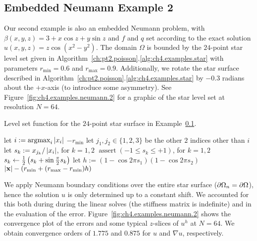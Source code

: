 \subsection{Embedded Neumann Example 2} \label{subsec:ch4.examples.neumann.2}

Our second example is also an embedded Neumann problem, with $\beta(x,y,z) = 3 + x \cos z + y \sin z$ and $f$ and $q$ set according to the exact solution $u(x,y,z) = z \cos \left( x^2 - y^2 \right)$. The domain $\Omega$ is bounded by the $24$-point star level set given in Algorithm~\ref{ch:pt2.poisson}.\ref{alg:ch4.examples.star} with parameters $r_{\text{min}} = 0.6$ and $r_{\text{max}} = 0.9$. Additionally, we rotate the star surface described in Algorithm~\ref{ch:pt2.poisson}.\ref{alg:ch4.examples.star} by $-0.3$ radians about the $+x$-axis (to introduce some asymmetry). See Figure~\ref{fig:ch4.examples.neumann.2} for a graphic of the star level set at resolution $N = 64$.

\begin{algorithm}[htbp]
\caption{Level set function for the $24$-point star surface in Example~\ref{subsec:ch4.examples.neumann.2}.}
\label{alg:ch4.examples.star}
\begin{algorithmic}[1]
\STATE {}
\STATE {}
\STATE let $i := \operatorname{argmax}_i \left\lvert x_i \right\rvert$
    \RETURN $-r_{\text{min}}$
\ENDIF
\STATE let $j_1, j_2 \in \{1, 2, 3\}$ be the other $2$ indices other than $i$
\STATE let $s_k := x_{j_k} / \left\lvert x_i \right\rvert$, for $k = 1,2$
\STATE {}
\STATE $\operatorname{assert}(-1 \leq s_k \leq +1)$, for $k = 1,2$
\STATE $s_k \leftarrow \frac{1}{2} \left( s_k + \sin \frac{\pi}{2} s_k \right)$ 
\STATE let $h := (1 - \cos 2 \pi s_1) (1 - \cos 2\pi s_2)$
\RETURN $\left\lvert \mathbf{x} \right\rvert - (r_{\text{min}} + (r_{\text{max}} - r_{\text{min}}) h)$
\end{algorithmic}
\end{algorithm}

We apply Neumann boundary conditions over the entire star surface ($\partial\Omega_n = \partial\Omega$), hence the solution $u$ is only determined up to a constant shift. We accounted for this both during during the linear solves (the stiffness matrix is indefinite) and in the evaluation of the error. Figure~\ref{fig:ch4.examples.neumann.2} shows the convergence plot of the errors and some typical $z$-slices of $u^h$ at $N = 64$. We obtain convergence orders of $1.775$ and $0.875$ for $u$ and $\nabla u$, respectively.

